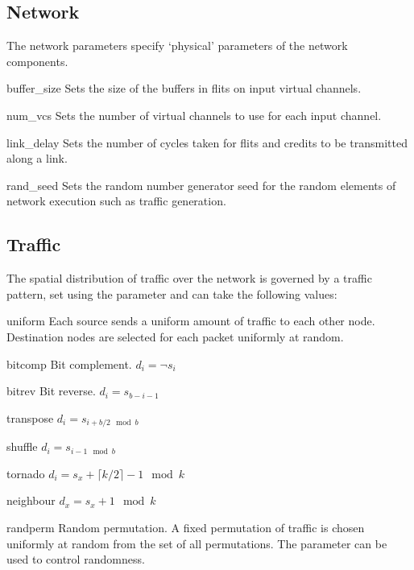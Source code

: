 \documentclass[10pt,a4paper]{article}
\begin{document}
\subsection{Network}

The network parameters specify `physical' parameters of the network components.

\begin{paramlist}

\item[buffer\_size] Sets the size of the buffers in flits on input virtual channels.

\item[num\_vcs] Sets the number of virtual channels to use for each input
channel.

\item[link\_delay] Sets the number of cycles taken for flits and credits to be
transmitted along a link.

\item[rand\_seed] Sets the random number generator seed for the random elements
of network execution such as traffic generation.

\end{paramlist}


\subsection{Traffic}

The spatial distribution of traffic over the network is governed by a traffic
pattern, set using the  parameter and can take the
following values:

\begin{paramlist}

\item[uniform] Each source sends a uniform amount of traffic to each other node.
Destination nodes are selected for each packet uniformly at random.

\item[bitcomp] Bit complement. $d_i = \neg s_i$

\item[bitrev] Bit reverse. $d_i = s_{b-i-1}$

\item[transpose] $d_i = s_{i+b/2 \mod b}$

\item[shuffle] $d_i = s_{i-1 \mod b}$

\item[tornado] $d_i = s_x + \lceil k/2 \rceil -1 \mod k$

\item[neighbour] $d_x = s_x + 1 \mod k$

\item[randperm] Random permutation. A fixed permutation of traffic is chosen
uniformly at random from the set of all permutations. The parameter
 can be used to control randomness.

\end{paramlist}
\end{document}

